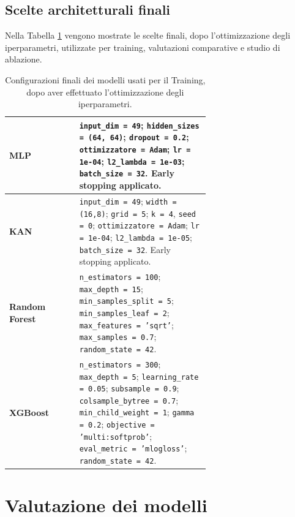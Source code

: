 \documentclass[a4paper,12pt]{report}
\begin{document}
	\subsection{Scelte architetturali finali}
	Nella Tabella \ref{tab:model-config-pm} vengono mostrate le scelte finali, dopo l'ottimizzazione degli iperparametri, utilizzate per training, valutazioni comparative e studio di ablazione.
	
	\begin{table}[H]
		\centering
		\caption{Configurazioni finali dei modelli usati per il Training, dopo aver effettuato l'ottimizzazione degli iperparametri.}
		\label{tab:model-config-pm}
		\begin{tabular}{l p{0.65\linewidth}}
			\toprule
			\textbf{MLP} & \texttt{input\_dim = 49}; \texttt{hidden\_sizes = (64, 64)}; \texttt{dropout = 0.2}; \texttt{ottimizzatore = Adam}; \texttt{lr = 1e-04}; \texttt{l2\_lambda = 1e-03}; \texttt{batch\_size = 32}. Early stopping applicato. \\
			\midrule
			\textbf{KAN} & \texttt{input\_dim = 49}; \texttt{width = (16,8)}; \texttt{grid = 5}; \texttt{k = 4}, \texttt{seed = 0}; \texttt{ottimizzatore = Adam}; \texttt{lr = 1e-04}; \texttt{l2\_lambda = 1e-05}; \texttt{batch\_size = 32}. Early stopping applicato. \\
			\midrule
			\textbf{Random Forest} & \texttt{n\_estimators = 100}; \texttt{max\_depth = 15}; \texttt{min\_samples\_split = 5}; \texttt{min\_samples\_leaf = 2}; \texttt{max\_features = 'sqrt'}; \texttt{max\_samples = 0.7}; \texttt{random\_state = 42}. \\
			\midrule
			\textbf{XGBoost} & \texttt{n\_estimators = 300}; \texttt{max\_depth = 5}; \texttt{learning\_rate = 0.05}; \texttt{subsample = 0.9}; \texttt{colsample\_bytree = 0.7}; \texttt{min\_child\_weight = 1}; \texttt{gamma = 0.2}; \texttt{objective = 'multi:softprob'}; \texttt{eval\_metric = 'mlogloss'}; \texttt{random\_state = 42}. \\
			\bottomrule
		\end{tabular}
	\end{table}
	
	\section{Valutazione dei modelli}
	
\end{document}
